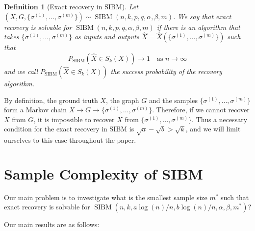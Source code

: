 \documentclass[conference]{IEEEtran}
\newtheorem{definition}{Definition}%
\DeclareMathOperator{\SIBM}{SIBM}
\begin{document}
	
	\begin{definition}[Exact recovery in SIBM]
		Let $(X,G,\{\sigma^{(1)},\dots,\sigma^{(m)}\}) \sim \SIBM(n,k,p,q,\alpha,\beta,m)$.
		We say that exact recovery is solvable for $\SIBM(n,k,p,q,\alpha,\beta,m)$ if there is an algorithm that takes $\{\sigma^{(1)},\dots,\sigma^{(m)}\}$ as inputs and outputs $\hat{X}=\hat{X}(\{\sigma^{(1)},\dots,\sigma^{(m)}\})$ such that
		$$
		P_{\SIBM}(\hat{X} \in S_k(X)) \to 1
		\text{~~~as~} n\to\infty
		$$
		and we call $P_{\SIBM}(\hat{X} \in S_k(X))$ the success probability of the recovery algorithm.
	\end{definition}
	
	By definition, the ground truth $X$, the graph $G$ and the samples $\{\sigma^{(1)},\dots,\sigma^{(m)}\}$ form a Markov chain $X\to G\to \{\sigma^{(1)},\dots,\sigma^{(m)}\}$. Therefore, if we cannot recover $X$ from $G$, it is impossible to recover $X$ from $\{\sigma^{(1)},\dots,\sigma^{(m)}\}$. Thus a necessary condition for the exact recovery in SIBM is $\sqrt{a}-\sqrt{b}> \sqrt{k}$, and we will limit ourselves to this case throughout the paper.
	
	\section{Sample Complexity of SIBM}\label{s:trans}
	Our main problem is to investigate what is the smallest sample size $m^\ast$ such that exact recovery is solvable for $\SIBM(n,k, a\log(n)/n, b\log(n)/n,\alpha,\beta,m^\ast)$?
	
	Our main results are as follows:
	
\end{document}
